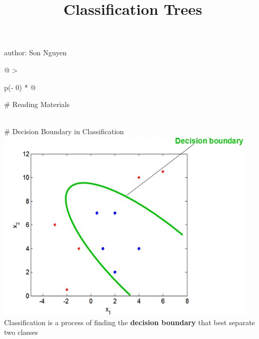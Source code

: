 \documentclass[
  ignorenonframetext,
]{beamer}
\title{Classification Trees}
\author{}
\date{\vspace{-2.5em}}
\begin{document}
\frame{\titlepage}

\begin{frame}
author: Son Nguyen

\begin{longtable}[]{@{}
  >{\raggedright\arraybackslash}p{(\columnwidth - 0\tabcolsep) * }@{}}
\toprule
\begin{minipage}[b]{\linewidth}\raggedright
\# Reading Materials
\end{minipage} \\
\midrule
\endhead
\# Decision Boundary in Classification \\
\includegraphics{images/db.png} \\
Classification is a process of finding the \textbf{decision boundary}
that best separate two classes \\
\bottomrule
\end{longtable}
\end{frame}
\end{document}
